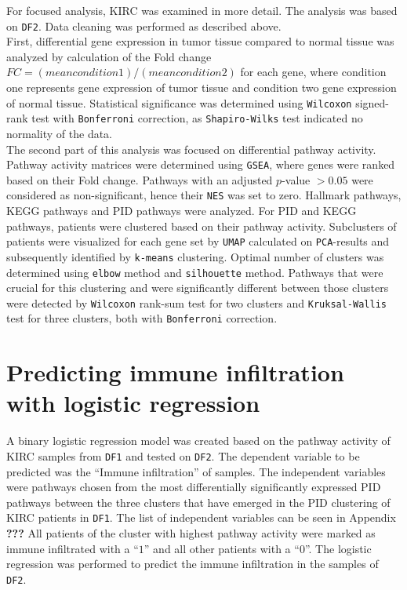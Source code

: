 \documentclass[
  parskip,
  oneside]{scrreprt}
\begin{document}
For focused analysis, KIRC was examined in more detail. The analysis was
based on \texttt{DF2}. Data cleaning was performed as described above.\\
First, differential gene expression in tumor tissue compared to normal
tissue was analyzed by calculation of the Fold change
\(FC =(mean condition 1) / (mean condition 2)\) for each gene, where
condition one represents gene expression of tumor tissue and condition
two gene expression of normal tissue. Statistical significance was
determined using \texttt{Wilcoxon} signed-rank test with
\texttt{Bonferroni} correction, as \texttt{Shapiro-Wilks} test indicated
no normality of the data.\\
The second part of this analysis was focused on differential pathway
activity. Pathway activity matrices were determined using \texttt{GSEA},
where genes were ranked based on their Fold change. Pathways with an
adjusted \(p\)-value \(>0.05\) were considered as non-significant, hence
their \texttt{NES} was set to zero. Hallmark pathways, KEGG pathways and
PID pathways were analyzed. For PID and KEGG pathways, patients were
clustered based on their pathway activity. Subclusters of patients were
visualized for each gene set by \texttt{UMAP} calculated on
\texttt{PCA}-results and subsequently identified by \texttt{k-means}
clustering. Optimal number of clusters was determined using
\texttt{elbow} method and \texttt{silhouette} method. Pathways that were
crucial for this clustering and were significantly different between
those clusters were detected by \texttt{Wilcoxon} rank-sum test for two
clusters and \texttt{Kruksal-Wallis} test for three clusters, both with
\texttt{Bonferroni} correction.

\hypertarget{predicting-immune-infiltration-with-logistic-regression}{%
\section{Predicting immune infiltration with logistic
regression}\label{predicting-immune-infiltration-with-logistic-regression}}

A binary logistic regression model was created based on the pathway
activity of KIRC samples from \texttt{DF1} and tested on \texttt{DF2}.
The dependent variable to be predicted was the ``Immune infiltration''
of samples. The independent variables were pathways chosen from the most
differentially significantly expressed PID pathways between the three
clusters that have emerged in the PID clustering of KIRC patients in
\texttt{DF1}. The list of independent variables can be seen in Appendix
\textbf{???} All patients of the cluster with highest pathway activity
were marked as immune infiltrated with a ``\(1\)'' and all other
patients with a ``\(0\)''. The logistic regression was performed to
predict the immune infiltration in the samples of \texttt{DF2}.
\end{document}
